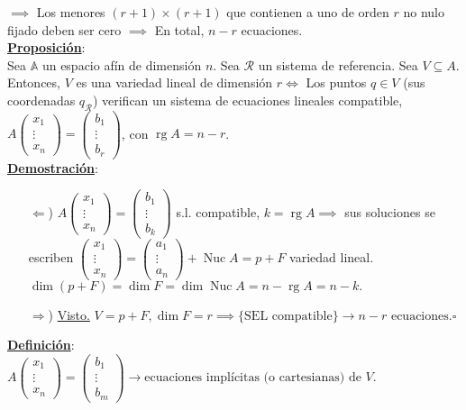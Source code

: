 \documentclass[11pt]{article}
\newcommand{\af}{\mathbb{A}}
\newcommand{\defi}{\underline{\textbf{Definición}}:\\}
\newcommand{\prop}{\underline{\textbf{Proposición}}:\\}
\newcommand{\dem}{\underline{\textbf{Demostración}}:\\}
\DeclareMathOperator{\rg}{rg}
\DeclareMathOperator{\nuc}{Nuc}
\begin{document}
$\implies$ Los menores $(r+1)\times(r+1)$ que contienen a uno de orden $r$ no nulo fijado deben ser cero $\implies$ En total, $n-r$ ecuaciones.\\
\prop Sea $\af$ un espacio afín de dimensión $n$. Sea $\mathcal{R}$ un sistema de referencia. Sea $V\subseteq A$. Entonces, $V$ es una variedad lineal de dimensión $r\iff$ Los puntos $q\in V$ (sus coordenadas $q_{\mathcal{R}}$) verifican un sistema de ecuaciones lineales compatible, $A\begin{pmatrix}
x_1\\
\vdots\\
x_n
\end{pmatrix}=\begin{pmatrix}
b_1\\
\vdots\\
b_r
\end{pmatrix}
$, con $\rg A=n-r$.\\
\dem \begin{itemize}
	\item[$\Leftarrow$)] $A\begin{pmatrix}
	x_1\\ \vdots\\ x_n
	\end{pmatrix}=\begin{pmatrix}
	b_1\\ \vdots\\ b_k
	\end{pmatrix}$ s.l. compatible, $k=\rg A\implies$ sus soluciones se escriben $\begin{pmatrix}
	x_1\\ \vdots\\ x_n
	\end{pmatrix}=\begin{pmatrix}
	a_1\\ \vdots\\ a_n
	\end{pmatrix}+\nuc A=p+F
	$ variedad lineal. $\dim(p+F)=\dim F=\dim\nuc A=n-\rg A=n-k.$
	\item[$\Rightarrow$)] \underline{Visto.} $V=p+F,\dim F=r\implies\{\textrm{SEL compatible}\}\rightarrow n-r\textrm{ ecuaciones.}\square$
\end{itemize}
\defi $A\begin{pmatrix}
x_1\\ \vdots\\ x_n
\end{pmatrix}=\begin{pmatrix}
b_1\\ \vdots\\ b_m
\end{pmatrix}\rightarrow\textrm{ecuaciones implícitas (o cartesianas) de }V.$
\end{document}
